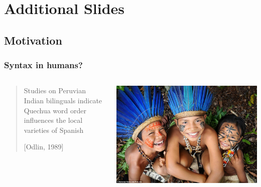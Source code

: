 \documentclass[mathserif,12pt]{beamer}
\begin{document}
\section{Additional Slides}

\subsection{Motivation}
\begin{frame}
\frametitle{Syntax in humans?}
\begin{center}
\begin{columns}
\begin{column}{0.7\textwidth}
  \begin{quote}
   Studies on Peruvian Indian bilinguals indicate Quechua word order influences the local varieties of Spanish
   
   [Odlin, 1989]
  \end{quote}
\end{column}
\begin{column}{0.3\textwidth}
  \begin{center}
   \includegraphics[width=\textwidth]{figures/amazon-tribes}
  \end{center}
\end{column}
\end{columns}
\vspace{0.5cm}
\begin{columns}

\begin{column}{0.3\textwidth}
   
\end{column}
\end{columns}
\end{center}
\end{frame}
\end{document}
